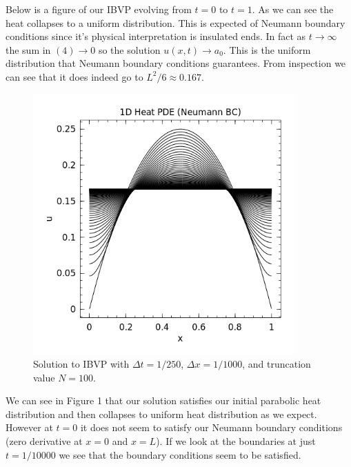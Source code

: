 \documentclass[10pt]{article}
\theoremstyle{remark}
\begin{document}
Below is a figure of our IBVP evolving from $t = 0$ to $t = 1$. As we can see the heat collapses to a uniform distribution. This is expected of Neumann boundary conditions since it's physical interpretation is insulated ends. In fact as $t \rightarrow \infty$ the sum in $(4) \rightarrow 0$ so the solution $u(x,t) \rightarrow a_0$. This is the uniform distribution that Neumann boundary conditions guarantees. From inspection we can see that it does indeed go to $L^2/6 \approx 0.167$.

\begin{figure}[H]
	\centering
	\includegraphics[width = 10cm]{1d_1.png}
	\caption{Solution to IBVP with $\Delta t = 1/250$, $\Delta x = 1/1000$, and truncation value $N  = 100$.}
\end{figure} 

We can see in Figure 1 that our solution satisfies our initial parabolic heat distribution and then collapses to uniform heat distribution as we expect. However at $t = 0$ it does not seem to satisfy our Neumann boundary conditions (zero derivative at $x = 0$ and $x = L$). If we look at the boundaries at just $t = 1/10000$ we see that the boundary conditions seem to be satisfied.
\end{document}
